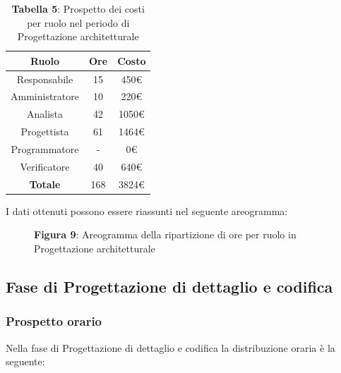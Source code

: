 \begin{table}[H]
	\centering
	\renewcommand{\arraystretch}{1.5}
	\begin{tabular}{|c|c|c|}
		\hline
		\rowcolor{lighter-grayer}
Ruolo & Ore & Costo \\ \hline
Responsabile & 15 & 450\euro \\ \hline
Amministratore & 10 & 220\euro \\ \hline
Analista & 42 & 1050\euro \\ \hline
Progettista & 61 & 1464\euro \\ \hline
Programmatore & - & 0\euro \\ \hline
Verificatore & 40 & 640\euro \\ \hline
\textbf{Totale} & 168 & 3824\euro \\ \hline
	\end{tabular}
	\caption*{\textbf{Tabella 5}: Prospetto dei costi per ruolo nel periodo di Progettazione architetturale\\}
\end{table}

I dati ottenuti possono essere riassunti nel seguente areogramma:


\begin{figure}[H]
	\centering
	\caption*{\textbf{Figura 9}: Areogramma della ripartizione di ore per ruolo in Progettazione architetturale}
	\label{fig:Figura10}
\end{figure}



\subsection{Fase di Progettazione di dettaglio e codifica}
\subsubsection{Prospetto orario}
Nella fase di Progettazione di dettaglio e codifica la distribuzione oraria è la seguente:

